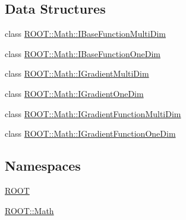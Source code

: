\subsection*{Data Structures}
\begin{DoxyCompactItemize}
\item 
class \mbox{\hyperlink{classROOT_1_1Math_1_1IBaseFunctionMultiDim}{R\+O\+O\+T\+::\+Math\+::\+I\+Base\+Function\+Multi\+Dim}}
\item 
class \mbox{\hyperlink{classROOT_1_1Math_1_1IBaseFunctionOneDim}{R\+O\+O\+T\+::\+Math\+::\+I\+Base\+Function\+One\+Dim}}
\item 
class \mbox{\hyperlink{classROOT_1_1Math_1_1IGradientMultiDim}{R\+O\+O\+T\+::\+Math\+::\+I\+Gradient\+Multi\+Dim}}
\item 
class \mbox{\hyperlink{classROOT_1_1Math_1_1IGradientOneDim}{R\+O\+O\+T\+::\+Math\+::\+I\+Gradient\+One\+Dim}}
\item 
class \mbox{\hyperlink{classROOT_1_1Math_1_1IGradientFunctionMultiDim}{R\+O\+O\+T\+::\+Math\+::\+I\+Gradient\+Function\+Multi\+Dim}}
\item 
class \mbox{\hyperlink{classROOT_1_1Math_1_1IGradientFunctionOneDim}{R\+O\+O\+T\+::\+Math\+::\+I\+Gradient\+Function\+One\+Dim}}
\end{DoxyCompactItemize}
\subsection*{Namespaces}
\begin{DoxyCompactItemize}
\item 
 \mbox{\hyperlink{namespaceROOT}{R\+O\+OT}}
\item 
 \mbox{\hyperlink{namespaceROOT_1_1Math}{R\+O\+O\+T\+::\+Math}}
\end{DoxyCompactItemize}
